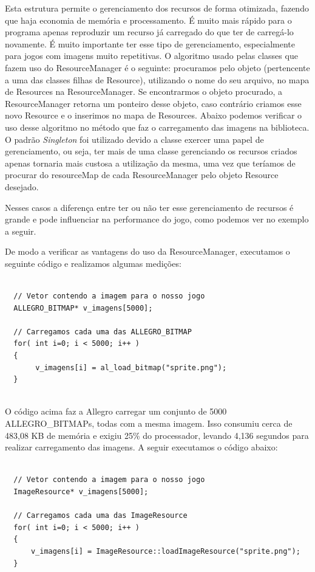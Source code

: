 Esta estrutura permite o gerenciamento dos recursos de forma otimizada, fazendo que haja economia de memória e processamento. É muito mais rápido para o programa apenas reproduzir um recurso já carregado do que ter de carregá-lo novamente. É muito importante ter esse tipo de gerenciamento, especialmente para jogos com imagens muito repetitivas. O algoritmo usado pelas classes que fazem uso do ResourceManager é o seguinte: procuramos pelo objeto (pertencente a uma das classes filhas de Resource), utilizando o nome do seu arquivo, no mapa de Resources na ResourceManager. Se encontrarmos o objeto procurado, a ResourceManager retorna um ponteiro desse objeto, caso contrário criamos esse novo Resource e o inserimos no mapa de Resources. Abaixo podemos verificar o uso desse algoritmo no método que faz o carregamento das imagens na biblioteca. O padrão \textit{Singleton} foi utilizado devido a classe exercer uma papel de gerenciamento, ou seja, ter mais de uma classe gerenciando os recursos criados apenas tornaria mais custosa a utilização da mesma, uma vez que teríamos de procurar do resourceMap de cada ResourceManager pelo objeto Resource desejado.
%

%
\par 
Nesses casos a diferença entre ter ou não ter esse gerenciamento de recursos é grande e pode influenciar na performance do jogo, como podemos ver no exemplo a seguir.
\par 
De modo a verificar as vantagens do uso da ResourceManager, executamos o seguinte código e realizamos algumas medições: 
%
%
\begin{lstlisting}

  // Vetor contendo a imagem para o nosso jogo
  ALLEGRO_BITMAP* v_imagens[5000];
      
  // Carregamos cada uma das ALLEGRO_BITMAP
  for( int i=0; i < 5000; i++ )
  {
       v_imagens[i] = al_load_bitmap("sprite.png");
  }
  
\end{lstlisting}
%
\par
O código acima faz a Allegro carregar um conjunto de 5000 ALLEGRO\_BITMAPs, todas com a mesma imagem. Isso consumiu cerca de 483,08 KB de memória e exigiu 25\% do processador, levando 4,136 segundos para realizar carregamento das imagens. A seguir executamos o código abaixo:
%
%
\begin{lstlisting}

  // Vetor contendo a imagem para o nosso jogo
  ImageResource* v_imagens[5000];
	
  // Carregamos cada uma das ImageResource
  for( int i=0; i < 5000; i++ )
  {
      v_imagens[i] = ImageResource::loadImageResource("sprite.png");
  }
	      
\end{lstlisting}
